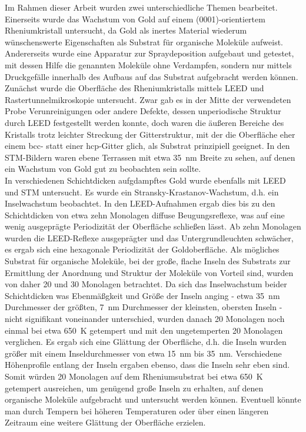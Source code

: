 Im Rahmen dieser Arbeit wurden zwei unterschiedliche Themen bearbeitet. Einerseits wurde das
Wachstum von Gold auf einem (0001)-orientiertem Rheniumkristall untersucht, da Gold als
inertes Material wiederum wünschenswerte Eigenschaften als Substrat für organische Moleküle
aufweist. Andererseits wurde eine Apparatur zur Spraydeposition aufgebaut und getestet, mit
dessen Hilfe die genannten Moleküle ohne Verdampfen, sondern nur mittels Druckgefälle innerhalb
des Aufbaus auf das Substrat aufgebracht werden können.
\\
Zunächst wurde die Oberfläche des Rheniumkristalls mittels LEED und Rastertunnelmikroskopie
untersucht. Zwar gab es in der Mitte der verwendeten Probe Verunreinigungen oder andere Defekte,
dessen unperiodische Struktur durch LEED festgestellt werden konnte, doch waren die äußeren Bereiche
des Kristalls trotz leichter Streckung der Gitterstruktur, mit der die Oberfläche eher einem bcc-
statt einer hcp-Gitter glich, als Substrat prinzipiell geeignet. In den STM-Bildern waren ebene
Terrassen mit etwa \SI{35}{nm} Breite zu sehen, auf denen ein Wachstum von Gold gut zu
beobachten sein sollte.
\\
In verschiedenen Schichtdicken aufgdampftes Gold wurde ebenfalls mit LEED und STM untersucht. Es
wurde ein Stransky-Krastanov-Wachstum, d.h. ein Inselwachstum beobachtet. In den LEED-Aufnahmen
ergab dies bis zu den Schichtdicken von etwa zehn Monolagen diffuse Beugungsreflexe, was auf eine
wenig ausgeprägte Periodizität der Oberfläche schließen lässt. Ab zehn Monolagen wurden die
LEED-Reflexe ausgeprägter und das Untergrundleuchten schwächer, es ergab sich eine hexagonale
Periodizität der Goldoberfläche. Als mögliches Substrat für organische Moleküle, bei der große,
flache Inseln des Substrats zur Ermittlung der Anordnung und Struktur der Moleküle von Vorteil sind,
wurden von daher 20 und 30 Monolagen betrachtet. Da sich das Inselwachstum beider Schichtdicken was Ebenmäßgkeit und Größe
der Inseln anging - etwa \SI{35}{nm} Durchmesser der größten, 
\SI{7}{nm} Durchmesser der kleinsten, obersten Inseln - nicht signifikant voneinander
unterschied, wurden danach 20 Monolagen noch einmal bei etwa \SI{650}{K} getempert und mit den ungetemperten 20 Monolagen verglichen. Es
ergab sich eine Glättung der Oberfläche, d.h. die Inseln wurden größer mit einem Inseldurchmesser
von etwa \SI{15}{nm} bis \SI{35}{nm}. Verschiedene Höhenprofile entlang der Inseln ergaben ebenso,
dass die Inseln sehr eben sind.
\\
Somit würden 20 Monolagen auf dem Rheniumsubstrat bei etwa \SI{650}{K} getempert ausreichen, um
genügend große Inseln zu erhalten, auf denen organische Moleküle aufgebracht und untersucht werden
können. Eventuell könnte man durch Tempern bei höheren Temperaturen oder über einen längeren
Zeitraum eine weitere Glättung der Oberfläche erzielen.
\\

